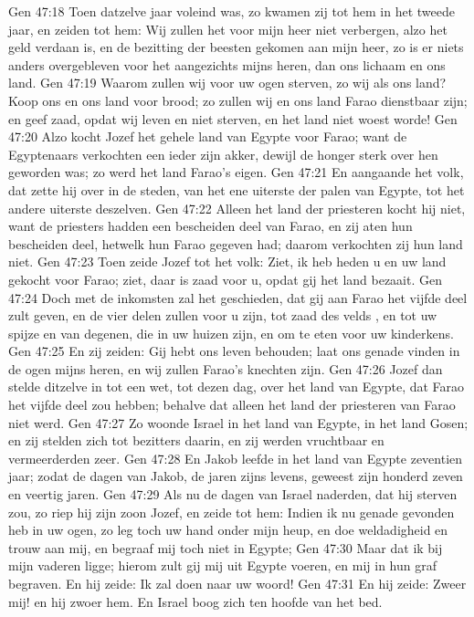 Gen 47:18  Toen datzelve jaar voleind was, zo kwamen zij tot hem in het tweede jaar, en zeiden tot hem: Wij zullen het voor mijn heer niet verbergen, alzo het geld verdaan is, en de bezitting der beesten gekomen aan mijn heer, zo is er niets anders overgebleven voor het aangezichts mijns heren, dan ons lichaam en ons land.
Gen 47:19  Waarom zullen wij voor uw ogen sterven, zo wij als ons land? Koop ons en ons land voor brood; zo zullen wij en ons land Farao dienstbaar zijn; en geef zaad, opdat wij leven en niet sterven, en het land niet woest worde!
Gen 47:20  Alzo kocht Jozef het gehele land van Egypte voor Farao; want de Egyptenaars verkochten een ieder zijn akker, dewijl de honger sterk over hen geworden was; zo werd het land Farao's eigen.
Gen 47:21  En aangaande het volk, dat zette hij over in de steden, van het ene uiterste der palen van Egypte, tot het andere uiterste deszelven.
Gen 47:22  Alleen het land der priesteren kocht hij niet, want de priesters hadden een bescheiden deel van Farao, en zij aten hun bescheiden deel, hetwelk hun Farao gegeven had; daarom verkochten zij hun land niet.
Gen 47:23  Toen zeide Jozef tot het volk: Ziet, ik heb heden u en uw land gekocht voor Farao; ziet, daar is zaad voor u, opdat gij het land bezaait.
Gen 47:24  Doch met de inkomsten zal het geschieden, dat gij aan Farao het vijfde deel zult geven, en de vier delen zullen voor u zijn, tot zaad des velds , en tot uw spijze en van degenen, die in uw huizen zijn, en om te eten voor uw kinderkens.
Gen 47:25  En zij zeiden: Gij hebt ons leven behouden; laat ons genade vinden in de ogen mijns heren, en wij zullen Farao's knechten zijn.
Gen 47:26  Jozef dan stelde ditzelve in tot een wet, tot dezen dag, over het land van Egypte, dat Farao het vijfde deel zou hebben; behalve dat alleen het land der priesteren van Farao niet werd.
Gen 47:27  Zo woonde Israel in het land van Egypte, in het land Gosen; en zij stelden zich tot bezitters daarin, en zij werden vruchtbaar en vermeerderden zeer.
Gen 47:28  En Jakob leefde in het land van Egypte zeventien jaar; zodat de dagen van Jakob, de jaren zijns levens, geweest zijn honderd zeven en veertig jaren.
Gen 47:29  Als nu de dagen van Israel naderden, dat hij sterven zou, zo riep hij zijn zoon Jozef, en zeide tot hem: Indien ik nu genade gevonden heb in uw ogen, zo leg toch uw hand onder mijn heup, en doe weldadigheid en trouw aan mij, en begraaf mij toch niet in Egypte;
Gen 47:30  Maar dat ik bij mijn vaderen ligge; hierom zult gij mij uit Egypte voeren, en mij in hun graf begraven. En hij zeide: Ik zal doen naar uw woord!
Gen 47:31  En hij zeide: Zweer mij! en hij zwoer hem. En Israel boog zich ten hoofde van het bed.
